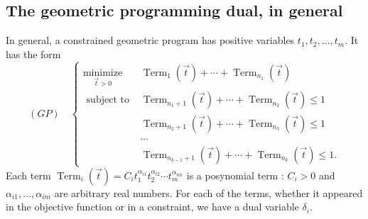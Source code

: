\documentclass[11pt,a4paper]{article}
\begin{document}
\subsection{The geometric programming dual, in general}
In general, a constrained geometric program has positive variables $t_1, t_2, \ldots, t_m$. It has the form
$$
(G P) \quad \begin{cases}\underset{\vec{t}>0}{\operatorname{minimize}} & \operatorname{Term}_1(\vec{t})+\cdots+\operatorname{Term}_{n_1}(\vec{t}) \\ \text { subject to } & \operatorname{Term}_{n_1+1}(\vec{t})+\cdots+\operatorname{Term}_{n_2}(\vec{t}) \leq 1 \\ & \operatorname{Term}_{n_2+1}(\vec{t})+\cdots+\operatorname{Term}_{n_3}(\vec{t}) \leq 1 \\ & \cdots \\ & \operatorname{Term}_{n_{k-1}+1}(\vec{t})+\cdots+\operatorname{Term}_{n_k}(\vec{t}) \leq 1 .\end{cases}
$$
Each term $\operatorname{Term}_i(\vec{t})=C_i t_1^{\alpha_{i 1}} t_2^{\alpha_{i 2}} \cdots t_m^{\alpha_{i m}}$ is a posynomial term : $C_i>0$ and $\alpha_{i 1}, \ldots, \alpha_{i m}$ are arbitrary real numbers. For each of the terms, whether it appeared in the objective function or in a constraint, we have a dual variable $\delta_i$.
\end{document}
